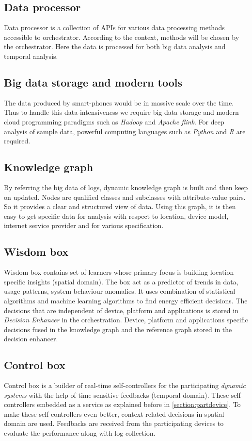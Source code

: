 \subsection{Data processor}
Data processor is a collection of APIs for various data processing methods accessible to orchestrator. According to the context, methods will be chosen by the orchestrator. Here the data is processed for both big data analysis and temporal analysis.
\subsection{Big data storage and modern tools}
The data produced by smart-phones would be in massive scale over the time. Thus to handle this data-intensiveness we require big data storage and modern cloud programming paradigms such as \emph{Hadoop} and \emph{Apache flink}. For deep analysis of sample data, powerful  computing languages such as \emph{Python} and \emph{R} are required.
\subsection{Knowledge graph}
By referring the big data of logs, dynamic knowledge graph is built and then keep on updated. Nodes are qualified classes and subclasses with attribute-value pairs. So it provides a clear and structured view of data. Using this graph, it is then easy to get specific data for analysis with respect to location, device model, internet service provider and for various specification.
\subsection{Wisdom box}
Wisdom box contains set of learners whose primary focus is building location specific insights (spatial domain). The box act as a predictor of trends in data, usage patterns, system behaviour anomalies. It uses combination of statistical algorithms and machine learning algorithms to find energy efficient decisions. The decisions that are independent of device, platform and applications is stored in \emph{Decision Enhancer} in the orchestration. Device, platform and applications specific decisions fused in the knowledge graph and the reference graph stored in the decision enhancer. 
\subsection{Control box}
Control box is a builder of real-time self-controllers for the participating \textit{dynamic systems} with the help of time-sensitive feedbacks (temporal domain). These self-controllers embedded as a service as explained before in \ref{section:partdevice}. To make these self-controllers even better, context related decisions in spatial domain are used. Feedbacks are received from the participating devices to evaluate the performance along with log collection.

